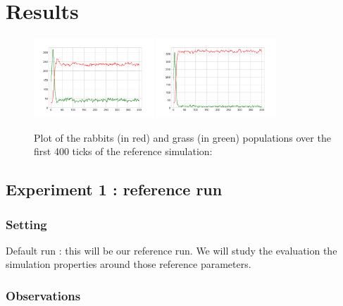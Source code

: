 \documentclass[11pt]{article}
\begin{document}
\section{Results}

\begin{figure}[h!]
    \centering
    \includegraphics[width=0.4\textwidth]{plots/sim1.png}
    \includegraphics[width=0.4\textwidth]{plots/sim4.png}
    \caption{Plot of the rabbits (in red) and grass (in green) populations over the first 400 ticks of the reference simulation:}
  \end{figure}

\subsection{Experiment 1 : reference run}

\subsubsection{Setting}

Default run : this will be our reference run. We will study the evaluation the simulation properties around those reference parameters. 

\subsubsection{Observations}

\end{document}
